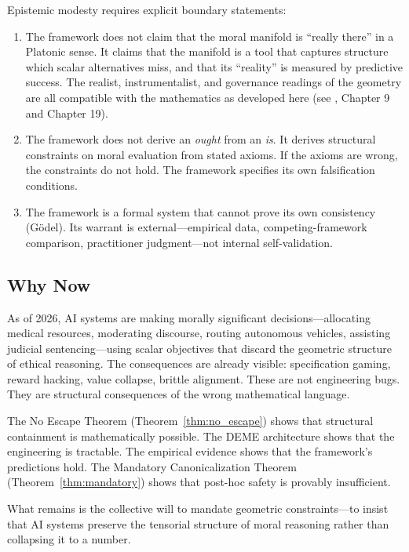 \documentclass[12pt,letterpaper]{article}
\theoremstyle{definition}
\theoremstyle{remark}
\begin{document}
Epistemic modesty requires explicit boundary statements:

\begin{enumerate}
    \item The framework does not claim that the moral manifold is ``really there'' in a Platonic sense. It claims that the manifold is a tool that captures structure which scalar alternatives miss, and that its ``reality'' is measured by predictive success. The realist, instrumentalist, and governance readings of the geometry are all compatible with the mathematics as developed here (see \cite{bond2026geometric}, Chapter 9 and Chapter 19).
    \item The framework does not derive an \emph{ought} from an \emph{is}. It derives structural constraints on moral evaluation from stated axioms. If the axioms are wrong, the constraints do not hold. The framework specifies its own falsification conditions.
    \item The framework is a formal system that cannot prove its own consistency (G\"{o}del). Its warrant is external---empirical data, competing-framework comparison, practitioner judgment---not internal self-validation.
\end{enumerate}

\subsection{Why Now}

As of 2026, AI systems are making morally significant decisions---allocating medical resources, moderating discourse, routing autonomous vehicles, assisting judicial sentencing---using scalar objectives that discard the geometric structure of ethical reasoning. The consequences are already visible: specification gaming, reward hacking, value collapse, brittle alignment. These are not engineering bugs. They are structural consequences of the wrong mathematical language.

The No Escape Theorem (Theorem~\ref{thm:no_escape}) shows that structural containment is mathematically possible. The DEME architecture shows that the engineering is tractable. The empirical evidence shows that the framework's predictions hold. The Mandatory Canonicalization Theorem (Theorem~\ref{thm:mandatory}) shows that post-hoc safety is provably insufficient.

What remains is the collective will to mandate geometric constraints---to insist that AI systems preserve the tensorial structure of moral reasoning rather than collapsing it to a number.
\end{document}
